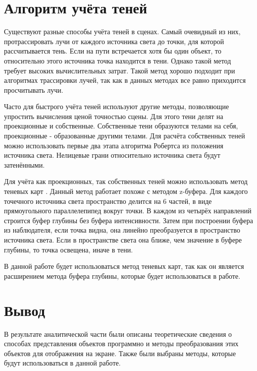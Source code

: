 \section{Алгоритм учёта теней}

Существуют разные способы учёта теней в сценах. Самый очевидный из них, протрассировать лучи от каждого источника света до точки, для которой рассчитывается тень. Если на пути встречается хотя бы один объект, то относительно этого источника точка находится в тени. Однако такой метод требует высоких вычислительных затрат. Такой метод хорошо подходит при алгоритмах трассировки лучей, так как в данных методах все равно приходится просчитывать лучи.

Часто для быстрого учёта теней используют другие методы, позволяющие упростить вычисления ценой точностью сцены. Для этого тени делят на проекционные и собственные. Собственные тени образуются телами на себя, проекционные - образованные другими телами. Для расчёта собственных теней можно использовать первые два этапа алгоритма Робертса из положения источника света. Нелицевые грани относительно источника света будут затенёнными.

Для учёта как проекционных, так собственных теней можно использовать метод теневых карт \cite{gabriella}. Данный метод работает похоже с методом z-буфера. Для каждого точечного источника света пространство делится на 6 частей, в виде прямоугольного параллелепипед вокруг точки. В каждом из четырёх направлений строится буфер глубины без буфера интенсивности. Затем при построении буфера из наблюдателя, если точка видна, она линейно преобразуется в пространство источника света. Если в пространстве света она ближе, чем значение в буфере глубины, то точка освещена, иначе в тени.

В данной работе будет использоваться метод теневых карт, так как он является расширением метода буфера глубины, которые будет использоваться в работе.

\section*{Вывод}

В результате аналитической части были описаны теоретические сведения о способах представления объектов программно и методы преобразования этих объектов для отображения на экране. Также были выбраны методы, которые будут использоваться в данной работе.

\clearpage
